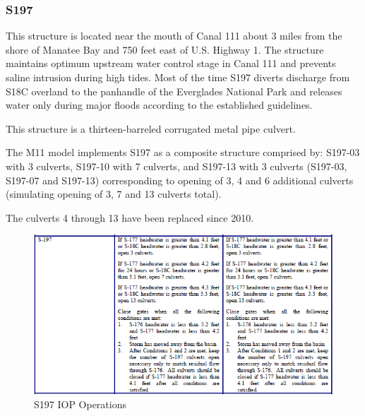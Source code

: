 


\clearpage
\subsubsection{S197}
This structure is located near the mouth of Canal 111 about 3 miles from the shore of Manatee Bay and 750 feet east of U.S. Highway 1. The structure maintains optimum upstream water control stage in Canal 111 and prevents saline intrusion during high tides. Most of the time S197 diverts discharge from S18C overland to the panhandle of the Everglades National Park and releases water only during major floods according to the established guidelines.

This structure is a thirteen-barreled corrugated metal pipe culvert.

The M11 model implements S197 as a composite structure comprised by: S197-03 with 3 culverts, S197-10 with 7 culverts, and S197-13 with 3 culverts (S197-03, S197-07 and S197-13) corresponding to opening of 3, 4 and 6 additional culverts (simulating opening of 3, 7 and 13 culverts total).

The culverts 4 through 13 have been replaced since 2010.

\begin{figure}[!h]
  \begin{center}
  \includegraphics[width=6.5in]{../figs/S197_IOPops.png}
  \caption{S197 IOP Operations}
  \label{fig:S197iop}
  \end{center}
\end{figure}

